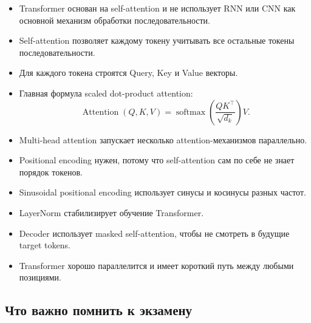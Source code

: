 \documentclass[a4paper,12pt]{article}
\begin{document}
\begin{itemize}
    \item Transformer основан на self-attention и не использует RNN или CNN как основной механизм обработки последовательности.
    \item Self-attention позволяет каждому токену учитывать все остальные токены последовательности.
    \item Для каждого токена строятся Query, Key и Value векторы.
    \item Главная формула scaled dot-product attention:
    \[
    \operatorname{Attention}(Q,K,V)
    =
    \operatorname{softmax}
    \left(
    \frac{QK^\top}{\sqrt{d_k}}
    \right)V.
    \]

    \item Multi-head attention запускает несколько attention-механизмов параллельно.
    \item Positional encoding нужен, потому что self-attention сам по себе не знает порядок токенов.
    \item Sinusoidal positional encoding использует синусы и косинусы разных частот.
    \item LayerNorm стабилизирует обучение Transformer.
    \item Decoder использует masked self-attention, чтобы не смотреть в будущие target tokens.
    \item Transformer хорошо параллелится и имеет короткий путь между любыми позициями.
\end{itemize}

\subsection{Что важно помнить к экзамену}
\end{document}
